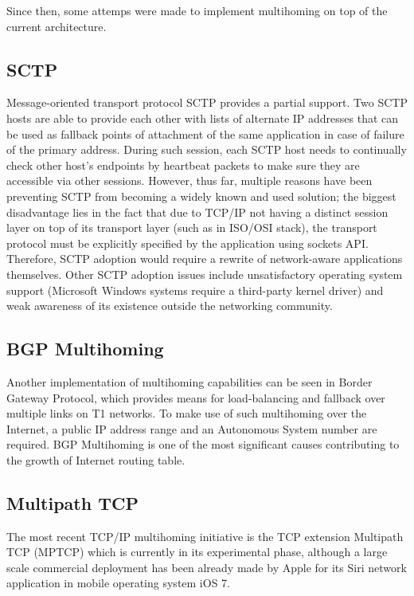         Since then, some attemps were made to implement multihoming on top of the current architecture.

        \subsection{SCTP}
        Message-oriented transport protocol SCTP provides a partial support. Two SCTP hosts are able to provide each other with lists of alternate IP addresses that can be used as fallback points of attachment of the same application in case of failure of the primary address. During such session, each SCTP host needs to continually check other host's endpoints by heartbeat packets to make sure they are accessible via other sessions. However, thus far, multiple reasons have been preventing SCTP from becoming a widely known and used solution; the biggest disadvantage lies in the fact that due to TCP/IP not having a distinct session layer on top of its transport layer (such as in ISO/OSI stack), the transport protocol must be explicitly specified by the application using sockets API. Therefore, SCTP adoption would require a rewrite of network-aware applications themselves. Other SCTP adoption issues include unsatisfactory operating system support (Microsoft Windows systems require a third-party kernel driver) and weak awareness of its existence outside the networking community.

        \subsection{BGP Multihoming}
        Another implementation of multihoming capabilities can be seen in Border Gateway Protocol, which provides means for load-balancing and fallback over multiple links on T1 networks. To make use of such multihoming over the Internet, a public IP address range and an Autonomous System number are required. BGP Multihoming is one of the most significant causes contributing to the growth of Internet routing table.

        \subsection{Multipath TCP}
        The most recent TCP/IP multihoming initiative is the TCP extension Multipath TCP (MPTCP) which is currently in its experimental phase, although a large scale commercial deployment has been already made by Apple for its Siri network application in mobile operating system iOS 7.

